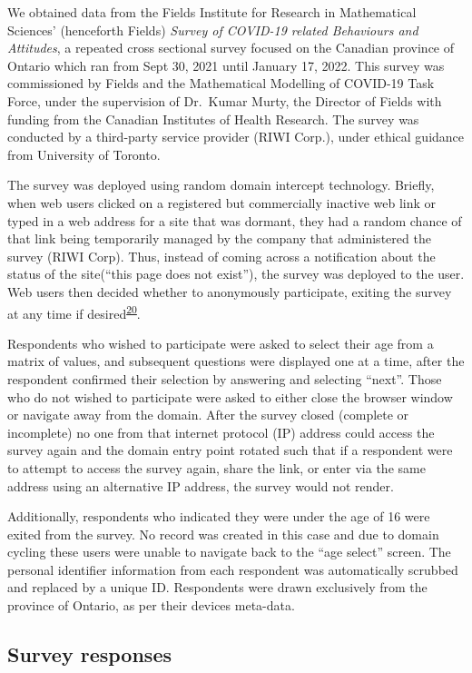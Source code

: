 \documentclass[
  letterpaper,
  DIV=11,
  numbers=noendperiod]{scrartcl}
\begin{document}
We obtained data from the Fields Institute for Research in Mathematical
Sciences' (henceforth Fields) \emph{Survey of COVID-19 related
Behaviours and Attitudes}, a repeated cross sectional survey focused on
the Canadian province of Ontario which ran from Sept 30, 2021 until
January 17, 2022. This survey was commissioned by Fields and the
Mathematical Modelling of COVID-19 Task Force, under the supervision of
Dr.~Kumar Murty, the Director of Fields with funding from the Canadian
Institutes of Health Research. The survey was conducted by a third-party
service provider (RIWI Corp.), under ethical guidance from University of
Toronto.

The survey was deployed using random domain intercept technology.
Briefly, when web users clicked on a registered but commercially
inactive web link or typed in a web address for a site that was dormant,
they had a random chance of that link being temporarily managed by the
company that administered the survey (RIWI Corp). Thus, instead of
coming across a notification about the status of the site(``this page
does not exist''), the survey was deployed to the user. Web users then
decided whether to anonymously participate, exiting the survey at any
time if
desired\textsuperscript{\protect\hyperlink{ref-sargent2022}{20}}.

Respondents who wished to participate were asked to select their age
from a matrix of values, and subsequent questions were displayed one at
a time, after the respondent confirmed their selection by answering and
selecting ``next''. Those who do not wished to participate were asked to
either close the browser window or navigate away from the domain. After
the survey closed (complete or incomplete) no one from that internet
protocol (IP) address could access the survey again and the domain entry
point rotated such that if a respondent were to attempt to access the
survey again, share the link, or enter via the same address using an
alternative IP address, the survey would not render.

Additionally, respondents who indicated they were under the age of 16
were exited from the survey. No record was created in this case and due
to domain cycling these users were unable to navigate back to the ``age
select'' screen. The personal identifier information from each
respondent was automatically scrubbed and replaced by a unique ID.
Respondents were drawn exclusively from the province of Ontario, as per
their devices meta-data.

\hypertarget{survey-responses}{%
\subsection{Survey responses}\label{survey-responses}}
\end{document}
